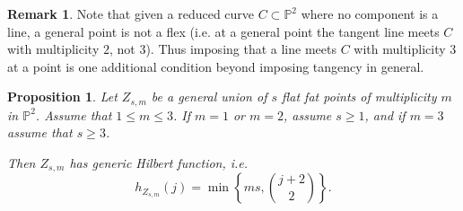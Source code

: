 \documentclass[12pt]{amsart}%
\numberwithin{equation}{section}
\newtheorem{proposition}[theorem]{Proposition}
\theoremstyle{definition}
\newtheorem{remark}[theorem]{Remark}
\numberwithin{equation}{section}
\begin{document}
\begin{remark} 
  \label{rem:flex}
Note that given a reduced curve $C \subset \mathbb P^2$  where no component is a line, a general point is not a flex \cite[Exercise 5.23]{FultonBook} (i.e. at a general point the tangent line meets $C$ with multiplicity $2$, not $3$). Thus imposing that a line meets $C$ with multiplicity 3 at a point is one additional condition beyond imposing tangency in general.    
\end{remark}


\begin{proposition} \label{GenFlatFat}
    Let $Z_{s,m}$ be a general union of $s$ flat fat points of multiplicity $m$ in $\mathbb P^2$. Assume that $1 \leq m \leq 3$. If $m = 1$ or $m=2$, assume $s \geq 1$, and if $m = 3$ assume that $s \geq 3$. 
    
    Then $Z_{s,m}$ has generic Hilbert function, i.e.
    \[    
    h_{Z_{s,m}}(j) = \min \left \{ ms, \binom{j+2}{2} \right \}.
    \]

\end{proposition}
\end{document}
